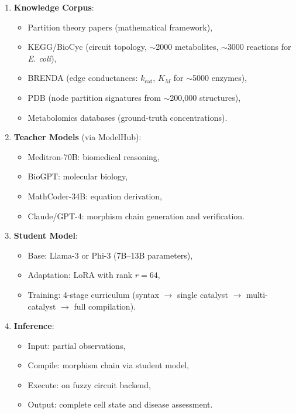 \documentclass[twocolumn,10pt,a4paper]{article}
\theoremstyle{definition}
\theoremstyle{remark}
\begin{document}
\begin{enumerate}[nosep]
    \item \textbf{Knowledge Corpus}:
    \begin{itemize}[nosep]
        \item Partition theory papers (mathematical framework),
        \item KEGG/BioCyc (circuit topology, $\sim$2000 metabolites, $\sim$3000 reactions for \emph{E. coli}),
        \item BRENDA (edge conductances: $k_{\mathrm{cat}}$, $K_M$ for $\sim$5000 enzymes),
        \item PDB (node partition signatures from $\sim$200{,}000 structures),
        \item Metabolomics databases (ground-truth concentrations).
    \end{itemize}
    \item \textbf{Teacher Models} (via ModelHub):
    \begin{itemize}[nosep]
        \item Meditron-70B: biomedical reasoning,
        \item BioGPT: molecular biology,
        \item MathCoder-34B: equation derivation,
        \item Claude/GPT-4: morphism chain generation and verification.
    \end{itemize}
    \item \textbf{Student Model}:
    \begin{itemize}[nosep]
        \item Base: Llama-3 or Phi-3 (7B--13B parameters),
        \item Adaptation: LoRA with rank $r = 64$,
        \item Training: 4-stage curriculum (syntax $\to$ single catalyst $\to$ multi-catalyst $\to$ full compilation).
    \end{itemize}
    \item \textbf{Inference}:
    \begin{itemize}[nosep]
        \item Input: partial observations,
        \item Compile: morphism chain via student model,
        \item Execute: on fuzzy circuit backend,
        \item Output: complete cell state and disease assessment.
    \end{itemize}
\end{enumerate}
\end{document}
